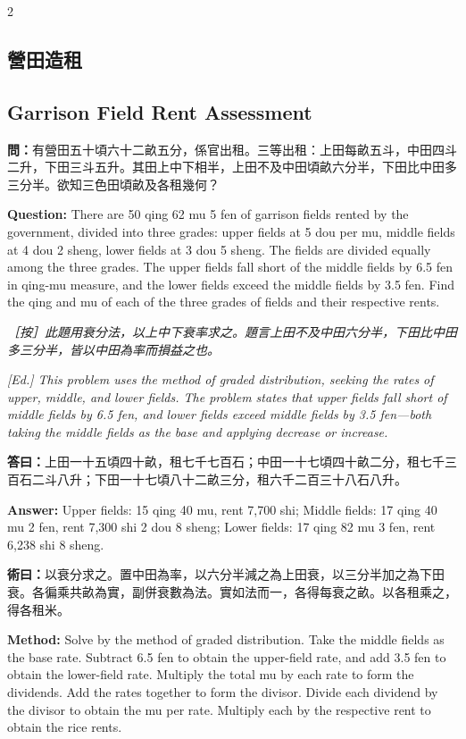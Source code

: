 \documentclass[11pt,a4paper]{article}
\newcommand{\QuestionText}[1]{\par\noindent\textbf{\color{problemcolor}問：}#1\par}
\newcommand{\AnswerText}[1]{\par\noindent\textbf{\color{answercolor}答曰：}#1\par}
\newcommand{\MethodText}[1]{\par\noindent\textbf{\color{methodcolor}術曰：}#1\par}
\newcommand{\EdNoteText}[1]{\par\noindent\textit{\color{ednotecolor}［按］#1}\par}
\newcommand{\QuestionEn}[1]{\par\noindent\textbf{\color{problemcolor}Question:} #1\par}
\newcommand{\AnswerEn}[1]{\par\noindent\textbf{\color{answercolor}Answer:} #1\par}
\newcommand{\MethodEn}[1]{\par\noindent\textbf{\color{methodcolor}Method:} #1\par}
\newcommand{\EdNoteEn}[1]{\par\noindent\textit{\color{ednotecolor}[Ed.] #1}\par}
\begin{document}
\begin{paracol}{2}

\subsection*{\color{sectioncolor}營田造租}
\switchcolumn
\subsection*{\color{sectioncolor}Garrison Field Rent Assessment}
\switchcolumn*

\QuestionText{有營田五十頃六十二畝五分，係官出租。三等出租：上田每畝五斗，中田四斗二升，下田三斗五升。其田上中下相半，上田不及中田頃畝六分半，下田比中田多三分半。欲知三色田頃畝及各租幾何？}
\switchcolumn
\QuestionEn{There are 50 qing 62 mu 5 fen of garrison fields rented by the government, divided into three grades: upper fields at 5 dou per mu, middle fields at 4 dou 2 sheng, lower fields at 3 dou 5 sheng. The fields are divided equally among the three grades. The upper fields fall short of the middle fields by 6.5 fen in qing-mu measure, and the lower fields exceed the middle fields by 3.5 fen. Find the qing and mu of each of the three grades of fields and their respective rents.}
\switchcolumn*

\EdNoteText{此題用衰分法，以上中下衰率求之。題言上田不及中田六分半，下田比中田多三分半，皆以中田為率而損益之也。}
\switchcolumn
\EdNoteEn{This problem uses the method of graded distribution, seeking the rates of upper, middle, and lower fields. The problem states that upper fields fall short of middle fields by 6.5 fen, and lower fields exceed middle fields by 3.5 fen---both taking the middle fields as the base and applying decrease or increase.}
\switchcolumn*

\AnswerText{上田一十五頃四十畝，租七千七百石；中田一十七頃四十畝二分，租七千三百石二斗八升；下田一十七頃八十二畝三分，租六千二百三十八石八升。}
\switchcolumn
\AnswerEn{Upper fields: 15 qing 40 mu, rent 7,700 shi; Middle fields: 17 qing 40 mu 2 fen, rent 7,300 shi 2 dou 8 sheng; Lower fields: 17 qing 82 mu 3 fen, rent 6,238 shi 8 sheng.}
\switchcolumn*

\MethodText{以衰分求之。置中田為率，以六分半減之為上田衰，以三分半加之為下田衰。各徧乘共畝為實，副併衰數為法。實如法而一，各得每衰之畝。以各租乘之，得各租米。}
\switchcolumn
\MethodEn{Solve by the method of graded distribution. Take the middle fields as the base rate. Subtract 6.5 fen to obtain the upper-field rate, and add 3.5 fen to obtain the lower-field rate. Multiply the total mu by each rate to form the dividends. Add the rates together to form the divisor. Divide each dividend by the divisor to obtain the mu per rate. Multiply each by the respective rent to obtain the rice rents.}
\switchcolumn*


\end{paracol}
\end{document}
